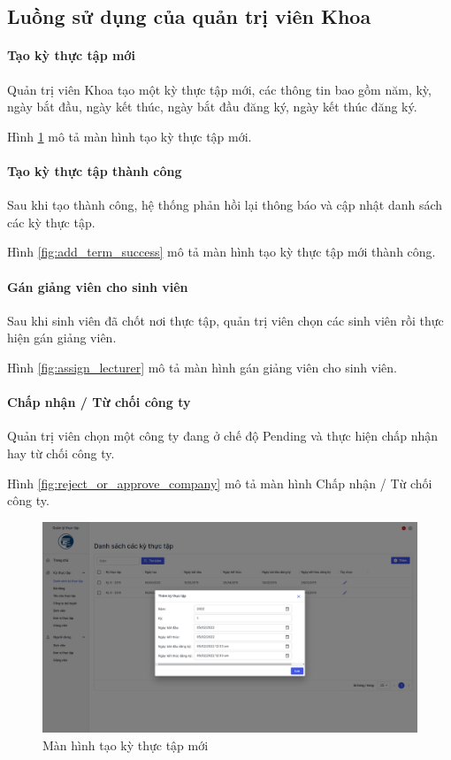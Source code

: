 \documentclass[./../main.tex]{subfiles}
\begin{document}
\subsection{Luồng sử dụng của quản trị viên Khoa}

\paragraph*{Tạo kỳ thực tập mới}

Quản trị viên Khoa tạo một kỳ thực tập mới, các thông tin bao gồm năm, kỳ, ngày bắt đầu, ngày kết thúc, ngày bắt đầu đăng ký, ngày kết thúc đăng ký.

Hình \ref{fig:add_term_page} mô tả màn hình tạo kỳ thực tập mới.

\paragraph*{Tạo kỳ thực tập thành công}

Sau khi tạo thành công, hệ thống phản hồi lại thông báo và cập nhật danh sách các kỳ thực tập.

Hình \ref{fig:add_term_success} mô tả màn hình tạo kỳ thực tập mới thành công.

\paragraph*{Gán giảng viên cho sinh viên}

Sau khi sinh viên đã chốt nơi thực tập, quản trị viên chọn các sinh viên rồi thực hiện gán giảng viên.

Hình \ref{fig:assign_lecturer} mô tả màn hình gán giảng viên cho sinh viên.

\paragraph*{Chấp nhận / Từ chối công ty}

Quản trị viên chọn một công ty đang ở chế độ Pending và thực hiện chấp nhận hay từ chối công ty.

Hình \ref{fig:reject_or_approve_company} mô tả màn hình Chấp nhận / Từ chối công ty.

\begin{figure}[]
	\includegraphics[width=\linewidth]{./images/image19.png}
	\caption{Màn hình tạo kỳ thực tập mới}
	\label{fig:add_term_page}
\end{figure}
\end{document}
